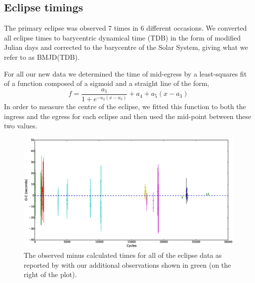 \documentclass[a4paper,fleqn,usenatbib]{mnras}
\begin{document}
\subsection{Eclipse timings}
The primary eclipse was observed 7 times in 6 different occasions.  We converted all eclipse times to barycentric dynamical time (TDB) in the form of modified Julian days and corrected to the barycentre of the Solar System, giving what we refer to as BMJD(TDB).

For all our new data we determined the time of mid-egress by a least-squares fit of a function composed of a sigmoid and a straight line of the form, 
\begin{equation}f = \frac{a_1}{1+e^{-a_2(x-a_3)}} + a_4 + a_5(x - a_3)\end{equation}
In order to measure the centre of the eclipse, we fitted this function to both the ingress and the egress for each eclipse and then used the mid-point between these two values.

\begin{figure}
	\includegraphics[width=\columnwidth]{images/css081231_oc.eps}
    \caption{The observed minus calculated times for all of the eclipse data as reported by \citet{Schwope2015} with our additional observations shown in green (on the right of the plot). }
    \label{fig:ocdiagram}
\end{figure}
\end{document}
